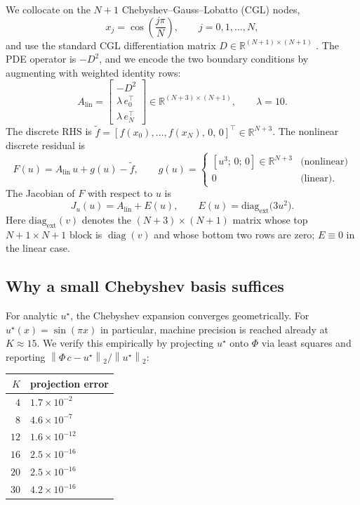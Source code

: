 \documentclass[11pt,a4paper]{article}
\newcommand{\R}{\mathbb{R}}
\newcommand{\norm}[1]{\left\lVert #1 \right\rVert}
\newcommand{\diag}{\operatorname{diag}}
\newcommand{\diagext}{\operatorname{diag_{ext}}}
\newcommand{\Alin}{A_{\mathrm{lin}}}
\begin{document}
We collocate on the $N+1$ Chebyshev--Gauss--Lobatto (CGL) nodes,
\begin{equation}
x_{j} = \cos\!\left(\frac{j\pi}{N}\right), \qquad j=0,1,\ldots,N,
\end{equation}
and use the standard CGL differentiation matrix
$D\in\R^{(N+1)\times(N+1)}$ \cite[Eq.~6.4]{trefethen2000}. The PDE operator is
$-D^{2}$, and we encode the two boundary conditions by augmenting with weighted
identity rows:
\begin{equation}
\Alin =
\begin{bmatrix}
-D^{2} \\[2pt] \lambda\, e_{0}^{\!\top}\\[2pt] \lambda\, e_{N}^{\!\top}
\end{bmatrix}
\in\R^{(N+3)\times(N+1)}, \qquad \lambda = 10.
\label{eq:Alin}
\end{equation}
The discrete RHS is
$\tilde f = [f(x_{0}),\ldots,f(x_{N}),\, 0,\, 0]^{\top}\in\R^{N+3}$. The
nonlinear discrete residual is
\begin{equation}
F(u) = \Alin\, u + g(u) - \tilde f,
\qquad
g(u) =
\begin{cases}
[u^{3};\,0;\,0]\in\R^{N+3} & \text{(nonlinear)}\\
0 & \text{(linear)}.
\end{cases}
\end{equation}
The Jacobian of $F$ with respect to $u$ is
\begin{equation}
J_{u}(u) = \Alin + E(u), \qquad
E(u) = \diagext\!\bigl(3u^{2}\bigr).
\label{eq:Ju}
\end{equation}
Here $\diagext(v)$ denotes the $(N+3)\times(N+1)$ matrix whose top
$N+1\times N+1$ block is $\diag(v)$ and whose bottom two rows are zero;
$E\equiv 0$ in the linear case.

\subsection{Why a small Chebyshev basis suffices}

For analytic $u^{\star}$, the Chebyshev expansion converges geometrically. For
$u^{\star}(x) = \sin(\pi x)$ in particular, machine precision is reached
already at $K\approx 15$. We verify this empirically by projecting $u^{\star}$
onto $\Phi$ via least squares and reporting $\norm{\Phi\, c - u^{\star}}_{2}/\norm{u^{\star}}_{2}$:

\medskip
\begin{center}
\begin{tabular}{rl}
\toprule
$K$ & projection error \\
\midrule
$4$  & $1.7\times 10^{-2}$ \\
$8$  & $4.6\times 10^{-7}$ \\
$12$ & $1.6\times 10^{-12}$ \\
$16$ & $2.5\times 10^{-16}$ \\
$20$ & $2.5\times 10^{-16}$ \\
$30$ & $4.2\times 10^{-16}$ \\
\bottomrule
\end{tabular}
\end{center}
\medskip
\end{document}
